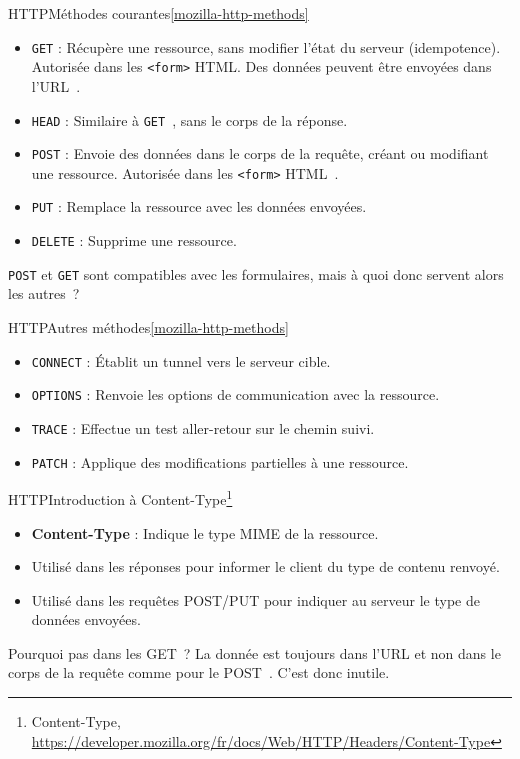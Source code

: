 \documentclass{beamer}
\begin{document}
    \begin{frame}{HTTP}{Méthodes courantes\cref{mozilla-http-methods}}
        \begin{itemize}
            \item \lstinline{GET} : Récupère une ressource, sans modifier l'état du serveur (idempotence).
            Autorisée dans les \lstinline{<form>} HTML. Des données peuvent être envoyées dans l'URL~.
            \item \lstinline{HEAD} : Similaire à \lstinline{GET}~, sans le corps de la réponse.
            \item \lstinline{POST} : Envoie des données dans le corps de la requête, créant ou modifiant une ressource.
            Autorisée dans les \lstinline{<form>} HTML~.
            \item \lstinline{PUT} : Remplace la ressource avec les données envoyées.
            \item \lstinline{DELETE} : Supprime une ressource.
        \end{itemize}
        \begin{dangercolorbox}
            \lstinline{POST} et \lstinline{GET} sont compatibles avec les formulaires, mais à quoi donc servent alors les autres~?
        \end{dangercolorbox}
    \end{frame}

    \begin{frame}{HTTP}{Autres méthodes\cref{mozilla-http-methods}}
        \begin{itemize}
            \item \lstinline{CONNECT} : Établit un tunnel vers le serveur cible.
            \item \lstinline{OPTIONS} : Renvoie les options de communication avec la ressource.
            \item \lstinline{TRACE} : Effectue un test aller-retour sur le chemin suivi.
            \item \lstinline{PATCH} : Applique des modifications partielles à une ressource.
        \end{itemize}
    \end{frame}

    \begin{frame}{HTTP}{Introduction à Content-Type\footnote{\label{mozilla-content-type}Content-Type, \url{https://developer.mozilla.org/fr/docs/Web/HTTP/Headers/Content-Type}}}
        \begin{itemize}
            \item \textbf{Content-Type} : Indique le type MIME de la ressource.
            \item Utilisé dans les réponses pour informer le client du type de contenu renvoyé.
            \item Utilisé dans les requêtes POST/PUT pour indiquer au serveur le type de données envoyées.
        \end{itemize}
        \bigbreak
        Pourquoi pas dans les GET~?
        \pause
        La donnée est toujours dans l'URL et non dans le corps de la requête comme pour le POST~.
        C'est donc inutile.
    \end{frame}
\end{document}
